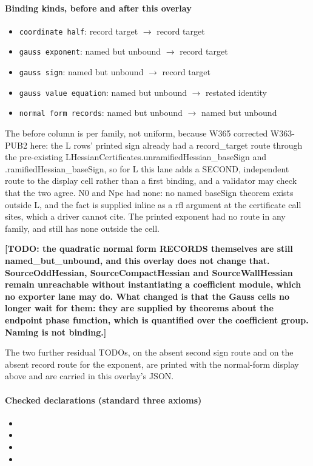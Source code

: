 \paragraph{Binding kinds, before and after this overlay}
\begin{itemize}
\item \texttt{coordinate half}: record target $\to$ record target
\item \texttt{gauss exponent}: named but unbound $\to$ record target
\item \texttt{gauss sign}: named but unbound $\to$ record target
\item \texttt{gauss value equation}: named but unbound $\to$ restated identity
\item \texttt{normal form records}: named but unbound $\to$ named but unbound
\end{itemize}
\par\noindent The before column is per family, not uniform, because W365 corrected W363-PUB2 here: the L rows' printed sign already had a record\_target route through the pre-existing LHessianCertificates.unramifiedHessian\_baseSign and .ramifiedHessian\_baseSign, so for L this lane adds a SECOND, independent route to the display cell rather than a first binding, and a validator may check that the two agree. N0 and Npc had none: no named baseSign theorem exists outside L, and the fact is supplied inline as a rfl argument at the certificate call sites, which a driver cannot cite. The printed exponent had no route in any family, and still has none outside the cell.
\par\noindent\textbf{[TODO: the quadratic normal form RECORDS themselves are still named\_but\_unbound, and this overlay does not change that. SourceOddHessian, SourceCompactHessian and SourceWallHessian remain unreachable without instantiating a coefficient module, which no exporter lane may do. What changed is that the Gauss cells no longer wait for them: they are supplied by theorems about the endpoint phase function, which is quantified over the coefficient group. Naming is not binding.]}
\par\noindent The two further residual TODOs, on the absent second sign route and on the absent record route for the exponent, are printed with the normal-form display above and are carried in this overlay's JSON.
\paragraph{Checked declarations (standard three axioms)}
\begin{itemize}
\item {}
\item {}
\item {}
\item {}
\end{itemize}
